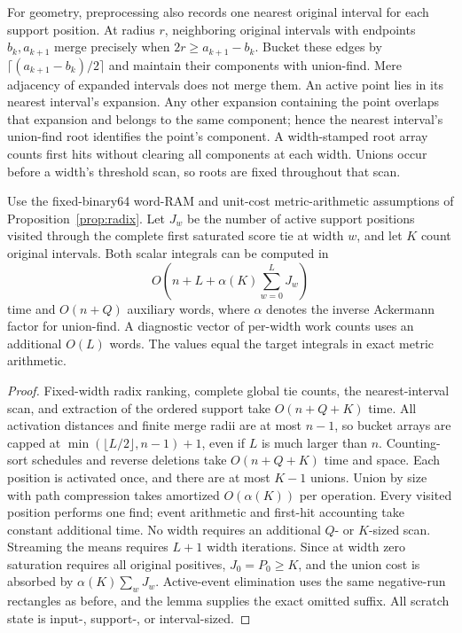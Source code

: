 For geometry, preprocessing also records one nearest original interval for
each support position. At radius $r$, neighboring original intervals with
endpoints $b_k,a_{k+1}$ merge precisely when
$2r\ge a_{k+1}-b_k$. Bucket these edges by
$\lceil(a_{k+1}-b_k)/2\rceil$ and maintain their components with union-find.
Mere adjacency of expanded intervals does not merge them. An active point
lies in its nearest interval's expansion. Any other expansion containing the
point overlaps that expansion and belongs to the same component; hence the
nearest interval's union-find root identifies the point's component. A
width-stamped root array counts first hits without clearing all components
at each width. Unions occur before a width's threshold scan, so roots are
fixed throughout that scan.

\begin{theorem}
Use the fixed-binary64 word-RAM and unit-cost metric-arithmetic assumptions
of Proposition~\ref{prop:radix}. Let $J_w$ be the number of active support
positions visited through the complete first saturated score tie at width
$w$, and let $K$ count original intervals. Both scalar integrals can be
computed in
\[
 O\!\left(n+L+\alpha(K)\sum_{w=0}^{L}J_w\right)
\]
time and $O(n+Q)$ auxiliary words, where $\alpha$ denotes the inverse
Ackermann factor for union-find. A diagnostic vector of per-width work
counts uses an additional $O(L)$ words. The values equal the target
integrals in exact metric arithmetic.
\end{theorem}
\begin{proof}
Fixed-width radix ranking, complete global tie counts, the nearest-interval
scan, and extraction of the ordered support take $O(n+Q+K)$ time.
All activation distances and finite merge radii are at most $n-1$, so
bucket arrays are capped at $\min(\lfloor L/2\rfloor,n-1)+1$, even if $L$
is much larger than $n$. Counting-sort schedules and reverse deletions take
$O(n+Q+K)$ time and space. Each position is activated once, and there are
at most $K-1$ unions. Union by size with path compression takes amortized
$O(\alpha(K))$ per operation. Every visited position performs one find;
event arithmetic and first-hit accounting take constant additional time.
No width requires an additional $Q$- or $K$-sized scan. Streaming the means
requires $L+1$ width iterations. Since at width zero saturation requires all
original positives, $J_0=P_0\ge K$, and the union cost is absorbed by
$\alpha(K)\sum_w J_w$. Active-event elimination uses the same negative-run
rectangles as before, and the lemma supplies the exact omitted suffix.
All scratch state is input-, support-, or interval-sized.
\end{proof}

